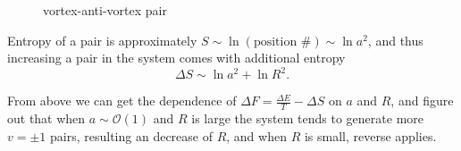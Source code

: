 \begin{figure}[ht]
    \centering
    \caption{vortex-anti-vortex pair}
    \label{fig:vortex-anti-vortex-pair}
\end{figure}

Entropy of a pair is approximately $S \sim \ln \left( \text{position \#} \right) \sim \ln a^{2}$, and thus increasing a pair in the system comes with additional entropy
\begin{equation}
  \Delta S \sim \ln a^{2} + \ln R^{2}.
\end{equation}

From above we can get the dependence of $\Delta F = \frac{\Delta E }{T} - \Delta S$ on $a$ and $R$, and figure out that when $a \sim \mathcal{O}(1)$ and $R$ is large the system tends to generate more $v=\pm 1$ pairs, resulting an decrease of $R$, and when $R$ is small, reverse applies.
